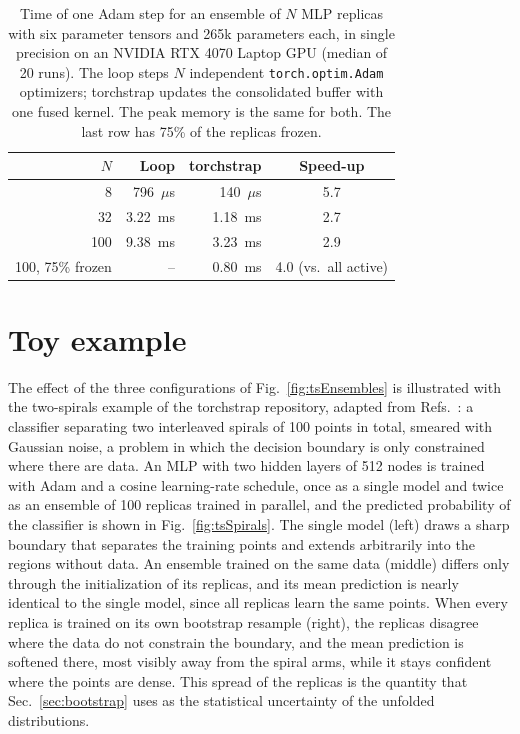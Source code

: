 \begin{table}[htbp]
	\caption[Timing of one optimizer step for an ensemble]{Time of one Adam step for an ensemble of \(N\) MLP replicas with six parameter tensors and 265k parameters each, in single precision on an NVIDIA RTX 4070 Laptop GPU (median of 20 runs). The loop steps \(N\) independent \texttt{torch.optim.Adam} optimizers; torchstrap updates the consolidated buffer with one fused kernel. The peak memory is the same for both. The last row has 75\% of the replicas frozen.}
	\label{tab:tsBenchmark}
	\centering
	\begin{tabular}{r | r r | c}
		\hline
		\(N\) & Loop & torchstrap & Speed-up \Tstrut \Bstrut \\
		\hline
		8 & 796~\(\mu\)s & 140~\(\mu\)s & 5.7 \\
		32 & 3.22~ms & 1.18~ms & 2.7 \\
		100 & 9.38~ms & 3.23~ms & 2.9 \\
		100, 75\% frozen & -- & 0.80~ms & 4.0 (vs.\ all active) \\
		\hline
	\end{tabular}
\end{table}

\section{Toy example}
\label{sec:tsToy}
The effect of the three configurations of Fig.~\ref{fig:tsEnsembles} is illustrated with the two-spirals example of the torchstrap repository, adapted from Refs.~\cite{Whitney2021Parallelizing,functorchParallelTrain}: a classifier separating two interleaved spirals of 100 points in total, smeared with Gaussian noise, a problem in which the decision boundary is only constrained where there are data.
%
An MLP with two hidden layers of 512 nodes is trained with Adam and a cosine learning-rate schedule, once as a single model and twice as an ensemble of 100 replicas trained in parallel, and the predicted probability of the classifier is shown in Fig.~\ref{fig:tsSpirals}.
%
The single model (left) draws a sharp boundary that separates the training points and extends arbitrarily into the regions without data.
%
An ensemble trained on the same data (middle) differs only through the initialization of its replicas, and its mean prediction is nearly identical to the single model, since all replicas learn the same points.
%
When every replica is trained on its own bootstrap resample (right), the replicas disagree where the data do not constrain the boundary, and the mean prediction is softened there, most visibly away from the spiral arms, while it stays confident where the points are dense.
%
This spread of the replicas is the quantity that Sec.~\ref{sec:bootstrap} uses as the statistical uncertainty of the unfolded distributions.


